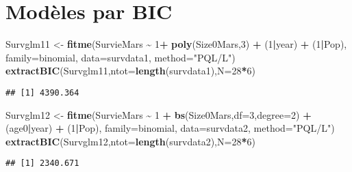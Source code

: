 \documentclass[
]{article}
\newenvironment{Shaded}{\begin{snugshade}}{\end{snugshade}}
\newcommand{\AttributeTok}[1]{\textcolor[rgb]{0.13,0.29,0.53}{#1}}
\newcommand{\DecValTok}[1]{\textcolor[rgb]{0.00,0.00,0.81}{#1}}
\newcommand{\FunctionTok}[1]{\textcolor[rgb]{0.13,0.29,0.53}{\textbf{#1}}}
\newcommand{\NormalTok}[1]{#1}
\newcommand{\OtherTok}[1]{\textcolor[rgb]{0.56,0.35,0.01}{#1}}
\newcommand{\SpecialCharTok}[1]{\textcolor[rgb]{0.81,0.36,0.00}{\textbf{#1}}}
\newcommand{\StringTok}[1]{\textcolor[rgb]{0.31,0.60,0.02}{#1}}
\begin{document}
\section{Modèles par BIC}\label{moduxe8les-par-bic}

\begin{Shaded}
\begin{Highlighting}[]
\NormalTok{Survglm11 }\OtherTok{\textless{}{-}} \FunctionTok{fitme}\NormalTok{(SurvieMars }\SpecialCharTok{\textasciitilde{}} \DecValTok{1}\SpecialCharTok{+} \FunctionTok{poly}\NormalTok{(Size0Mars,}\DecValTok{3}\NormalTok{) }\SpecialCharTok{+}\NormalTok{ (}\DecValTok{1}\SpecialCharTok{|}\NormalTok{year) }\SpecialCharTok{+}\NormalTok{ (}\DecValTok{1}\SpecialCharTok{|}\NormalTok{Pop),}
                  \AttributeTok{family=}\NormalTok{binomial,}
                  \AttributeTok{data=}\NormalTok{survdata1,}
                  \AttributeTok{method=}\StringTok{"PQL/L"}\NormalTok{)}
\FunctionTok{extractBIC}\NormalTok{(Survglm11,}\AttributeTok{ntot=}\FunctionTok{length}\NormalTok{(survdata1),}\AttributeTok{N=}\DecValTok{28}\SpecialCharTok{*}\DecValTok{6}\NormalTok{)}
\end{Highlighting}
\end{Shaded}

\begin{verbatim}
## [1] 4390.364
\end{verbatim}

\begin{Shaded}
\begin{Highlighting}[]
\NormalTok{Survglm12 }\OtherTok{\textless{}{-}} \FunctionTok{fitme}\NormalTok{(SurvieMars }\SpecialCharTok{\textasciitilde{}} \DecValTok{1} \SpecialCharTok{+} \FunctionTok{bs}\NormalTok{(Size0Mars,}\AttributeTok{df=}\DecValTok{3}\NormalTok{,}\AttributeTok{degree=}\DecValTok{2}\NormalTok{) }\SpecialCharTok{+}\NormalTok{ (age0}\SpecialCharTok{|}\NormalTok{year) }\SpecialCharTok{+}\NormalTok{ (}\DecValTok{1}\SpecialCharTok{|}\NormalTok{Pop),}
                  \AttributeTok{family=}\NormalTok{binomial,}
                  \AttributeTok{data=}\NormalTok{survdata2,}
                  \AttributeTok{method=}\StringTok{"PQL/L"}\NormalTok{)}
\FunctionTok{extractBIC}\NormalTok{(Survglm12,}\AttributeTok{ntot=}\FunctionTok{length}\NormalTok{(survdata2),}\AttributeTok{N=}\DecValTok{28}\SpecialCharTok{*}\DecValTok{6}\NormalTok{)}
\end{Highlighting}
\end{Shaded}

\begin{verbatim}
## [1] 2340.671
\end{verbatim}
\end{document}
